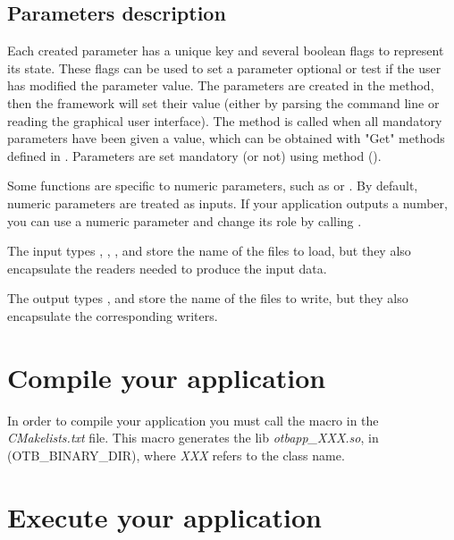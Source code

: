 \subsection{Parameters description}

Each created parameter has a unique key and several boolean flags to represent its state. These flags
can be used to set a parameter optional or test if the user has modified the parameter value. The parameters
are created in the  method, then the framework will set their value (either by parsing the 
command line or reading the graphical user interface). The  method is called when all 
mandatory parameters have been given a value, which can be obtained with "Get" methods defined in 
. Parameters are set mandatory (or not) using  method ().

Some functions are specific to numeric parameters, such as 
or . By default, numeric parameters are treated as inputs.
If your application outputs a number, you can use a numeric parameter and change its role by calling 
.

The input types , , , 
and  store the name of the files to load, but they also encapsulate the 
readers needed to produce the input data.

The output types ,  and  store the 
name of the files to write, but they also encapsulate the corresponding writers.

\section{Compile your application}

In order to compile your application you must call the macro  in the \emph{CMakelists.txt} file. 
This macro generates the lib \emph{otbapp\_XXX.so}, in (OTB\_BINARY\_DIR), where \emph{XXX} refers to the class name.

\section{Execute your application}

